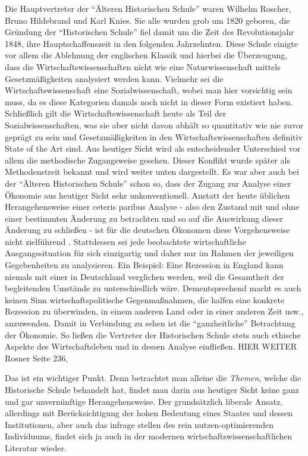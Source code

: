 Die Hauptvertreter der "`Älteren Historischen Schule"' waren Wilhelm Roscher, Bruno Hildebrand und Karl Knies. Sie alle wurden grob um 1820 geboren, die Gründung der "`Historischen Schule"' fiel damit um die Zeit des Revolutionsjahr 1848, ihre Hauptschaffenszeit in den folgenden Jahrzehnten. Diese Schule einigte vor allem die Ablehnung der englischen Klassik und hierbei die Überzeugung, dass die Wirtschaftswissenschaften nicht wie eine Naturwissenschaft mittels Gesetzmäßigkeiten analysiert werden kann. Vielmehr sei die Wirtschaftswissenschaft eine Sozialwissenschaft, wobei man hier vorsichtig sein muss, da es diese Kategorien damals noch nicht in dieser Form existiert haben. Schließlich gilt die Wirtschaftswissenschaft heute als Teil der Sozialwissenschaften, was sie aber nicht davon abhält so quantitativ wie nie zuvor geprägt zu sein und Gesetzmäßigkeiten in den Wirtschaftswissenschaften definitiv State of the Art sind. Aus heutiger Sicht wird als entscheidender Unterschied vor allem die methodische Zugangsweise gesehen. Dieser Konflikt wurde später als Methodenstreit bekannt und wird weiter unten dargestellt. Es war aber auch bei der "`Älteren Historischen Schule"' schon so, dass der Zugang zur Analyse einer Ökonomie aus heutiger Sicht sehr unkonventionell. Anstatt der heute üblichen Herangehensweise einer ceteris paribus Analyse - also den Zustand mit und ohne einer bestimmten Änderung zu betrachten und so auf die Auswirkung dieser Änderung zu schließen - ist für die deutschen Ökonomen diese Vorgehensweise nicht zielführend \parencite[S. 236]{Rosner2012}. Stattdessen sei jede beobachtete wirtschaftliche Ausgangssituation für sich einzigartig und daher nur im Rahmen der jeweiligen Gegebenheiten zu analysieren. Ein Beispiel: Eine Rezession in England kann niemals mit einer in Deutschland verglichen werden, weil die Gesamtheit der begleitenden Umstände zu unterschiedlich wäre. Dementsprechend macht es auch keinen Sinn wirtschaftspolitische Gegenmaßnahmen, die halfen eine konkrete Rezession zu überwinden, in einem anderen Land oder in einer anderen Zeit usw., anzuwenden. Damit in Verbindung zu sehen ist die "`ganzheitliche"' Betrachtung der Ökonomie. So ließen die Vertreter der Historischen Schule stets auch ethische Aspekte des Wirtschaftsleben und in dessen Analyse einfließen. HIER WEITER Rosner Seite 236,

Das ist ein wichtiger Punkt. Denn betrachtet man alleine die \textit{Themen}, welche die Historische Schule behandelt hat, findet man darin aus heutiger Sicht keine ganz und gar unvernünftige Herangehensweise. Der grundsätzlich liberale Ansatz, allerdings mit Berücksichtigung der hohen Bedeutung eines Staates und dessen Institutionen, aber auch das infrage stellen des rein nutzen-optimierenden Individuums, findet sich ja auch in der modernen wirtschaftswissenschaftlichen Literatur wieder. 



